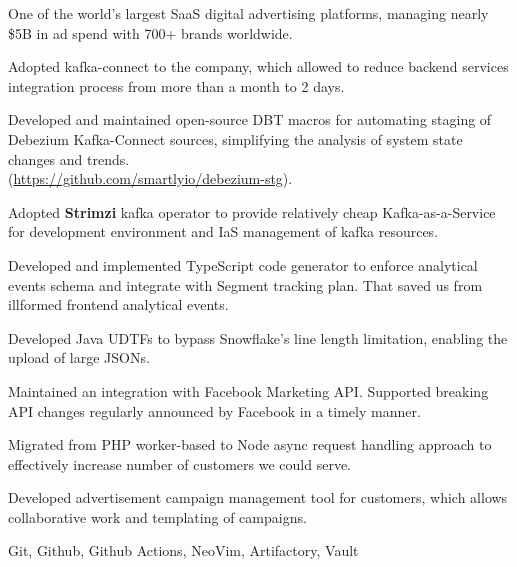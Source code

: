   One of the world’s largest SaaS digital advertising platforms, managing
  nearly \$5B in ad spend with 700+ brands worldwide.
  \begin{gaas}
    \item Adopted kafka-connect to the company, which allowed to reduce
      backend services integration process from more than a month to 2 days.
    \item Developed and maintained open-source DBT macros for automating
      staging of Debezium Kafka-Connect sources, simplifying the analysis of
      system state changes and trends. \\
      (\href{https://github.com/smartlyio/debezium-stg}{https://github.com/smartlyio/debezium-stg}).
    \item Adopted \textbf{Strimzi} kafka operator to provide relatively
      cheap Kafka-as-a-Service for development environment and IaS
      management of kafka resources.
    \item Developed and implemented TypeScript code generator to enforce
      analytical events schema and integrate with Segment tracking plan.
      That saved us from illformed frontend analytical events.
    \item Developed Java UDTFs to bypass Snowflake's line length limitation,
      enabling the upload of large JSONs.
    \item Maintained an integration with Facebook Marketing API. Supported
      breaking API changes regularly announced by Facebook in a timely
      manner.
    \item Migrated from PHP worker-based to Node async request handling
      approach to effectively increase number of customers we could serve.
    \item Developed advertisement campaign management tool for customers,
      which allows collaborative work and templating of campaigns.
  \end{gaas}
  \devtools
    Git, Github, Github Actions, NeoVim, Artifactory, Vault
